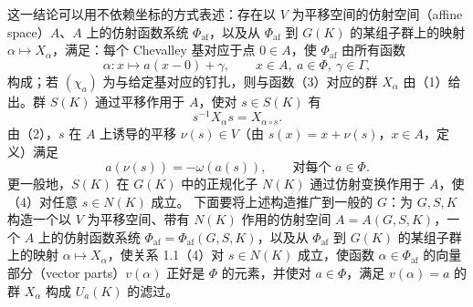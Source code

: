 这一结论可以用不依赖坐标的方式表述：存在以 $V$ 为平移空间的仿射空间（affine space）$A$、$A$ 上的仿射函数系统 $\Phi_{\mathrm{af}}$，以及从 $\Phi_{\mathrm{af}}$ 到 $G(K)$ 的某组子群上的映射 $\alpha\mapsto X_\alpha$，满足：每个 Chevalley 基对应于点 $0\in A$，使 $\Phi_{\mathrm{af}}$ 由所有函数
\[
\alpha:x\longmapsto a(x-0)+\gamma,\qquad x\in A,\ a\in\Phi,\ \gamma\in\Gamma,\tag{1.1(3)}
\]
构成；若 $(\chi_a)$ 为与给定基对应的钉扎，则与函数（3）对应的群 $X_\alpha$ 由（1）给出。群 $S(K)$ 通过平移作用于 $A$，使对 $s\in S(K)$ 有
\[
s^{-1}X_\alpha s=X_{\alpha\circ s}.\tag{1.1(4)}
\]
由（2），$s$ 在 $A$ 上诱导的平移 $\nu(s)\in V$（由 $s(x)=x+\nu(s)$，$x\in A$，定义）满足
\[
a(\nu(s))=-\omega(a(s)),\qquad\text{对每个 }a\in\Phi.\tag{1.1(5)}
\]
更一般地，$S(K)$ 在 $G(K)$ 中的正规化子 $N(K)$ 通过仿射变换作用于 $A$，使（4）对任意 $s\in N(K)$ 成立。
下面要将上述构造推广到一般的 $G$：为 $G,S,K$ 构造一个以 $V$ 为平移空间、带有 $N(K)$ 作用的仿射空间 $A=A(G,S,K)$，一个 $A$ 上的仿射函数系统 $\Phi_{\mathrm{af}}=\Phi_{\mathrm{af}}(G,S,K)$，以及从 $\Phi_{\mathrm{af}}$ 到 $G(K)$ 的某组子群上的映射 $\alpha\mapsto X_\alpha$，使关系 1.1（4）对 $s\in N(K)$ 成立，使函数 $\alpha\in\Phi_{\mathrm{af}}$ 的向量部分（vector parts）$v(\alpha)$ 正好是 $\Phi$ 的元素，并使对 $a\in\Phi$，满足 $v(\alpha)=a$ 的群 $X_\alpha$ 构成 $U_a(K)$ 的滤过。

